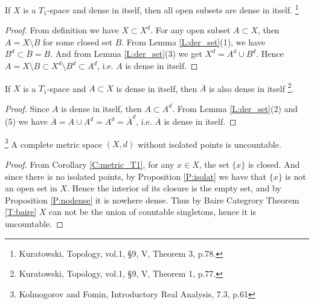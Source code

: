 \begin{theorem} \label{dii_open}
If $X$ is a $T_1$-space and dense in itself, then all open subsets are dense in
itself.
\footnote{Kuratowski, Topology, vol.1, \S 9, V, Theorem 3, p.78.}
\end{theorem}
\begin{proof}
From definition we have $X\subset X^d$. For any open subset $A\subset X$, then
$A=X\setminus B$ for some closed set $B$. From Lemma \ref{L:der_set}(1), we have
$B^d\subset\overline{B}=B$. And from Lemma \ref{L:der_set}(3) we get 
$X^d=A^d\cup B^d$. Hence $A=X\setminus B\subset X^d\setminus B^d\subset A^d$,
i.e. $A$ is dense in itself.
\end{proof}

\begin{theorem} \label{dii_clo}
If $X$ is a $T_1$-space and $A\subset X$ is dense in itself, then $\overline{A}$
is also dense in itself
\footnote{Kuratowski, Topology, vol.1, \S 9, V, Theorem 1, p.77.}.
\end{theorem}
\begin{proof}
Since $A$ is dense in itself, then $A\subset A^d$. From Lemma \ref{L:der_set}(2)
and (5) we have $\overline{A}=A\cup A^d=A^d=\overline{A}^d$, i.e. $\overline{A}$
is dense in itself.
\end{proof}

\begin{corollary} \label{C:comp_uncount}
\footnote{Kolmogorov and Fomin, Introductory Real Analysis, 7.3, p.61}
A complete metric space $(X,d)$ without isolated points is uncountable.
\end{corollary}
\begin{proof}
From Corollary \ref{C:metric_T1}, for any $x\in X$, the set $\{x\}$ is closed.
And since there is no isolated points, by Proposition \ref{P:isolat} we have 
that $\{x\}$ is not an open set in $X$.
Hence the interior of its closure is the empty set, and by Proposition
\ref{P:nodense}
it is nowhere dense.
Thus by Baire Categrory Theorem \ref{T:baire} $X$ can not be the union of 
countable singletons, hence it is uncountable.
\end{proof}

